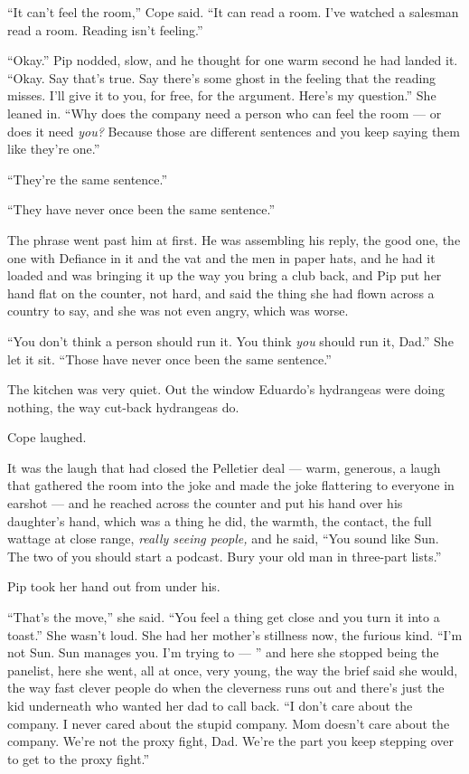 \documentclass[11pt,openany]{book}
\begin{document}
``It can't feel the room,'' Cope said. ``It can read a room. I've watched a salesman read a room. Reading isn't feeling.''

``Okay.'' Pip nodded, slow, and he thought for one warm second he had landed it. ``Okay. Say that's true. Say there's some ghost in the feeling that the reading misses. I'll give it to you, for free, for the argument. Here's my question.'' She leaned in. ``Why does the company need a person who can feel the room --- or does it need \textit{you?} Because those are different sentences and you keep saying them like they're one.''

``They're the same sentence.''

``They have never once been the same sentence.''

The phrase went past him at first. He was assembling his reply, the good one, the one with Defiance in it and the vat and the men in paper hats, and he had it loaded and was bringing it up the way you bring a club back, and Pip put her hand flat on the counter, not hard, and said the thing she had flown across a country to say, and she was not even angry, which was worse.

``You don't think a person should run it. You think \textit{you} should run it, Dad.'' She let it sit. ``Those have never once been the same sentence.''

The kitchen was very quiet. Out the window Eduardo's hydrangeas were doing nothing, the way cut-back hydrangeas do.

Cope laughed.

It was the laugh that had closed the Pelletier deal --- warm, generous, a laugh that gathered the room into the joke and made the joke flattering to everyone in earshot --- and he reached across the counter and put his hand over his daughter's hand, which was a thing he did, the warmth, the contact, the full wattage at close range, \textit{really seeing people,} and he said, ``You sound like Sun. The two of you should start a podcast. Bury your old man in three-part lists.''

Pip took her hand out from under his.

``That's the move,'' she said. ``You feel a thing get close and you turn it into a toast.'' She wasn't loud. She had her mother's stillness now, the furious kind. ``I'm not Sun. Sun manages you. I'm trying to --- '' and here she stopped being the panelist, here she went, all at once, very young, the way the brief said she would, the way fast clever people do when the cleverness runs out and there's just the kid underneath who wanted her dad to call back. ``I don't care about the company. I never cared about the stupid company. Mom doesn't care about the company. We're not the proxy fight, Dad. We're the part you keep stepping over to get to the proxy fight.''
\end{document}

